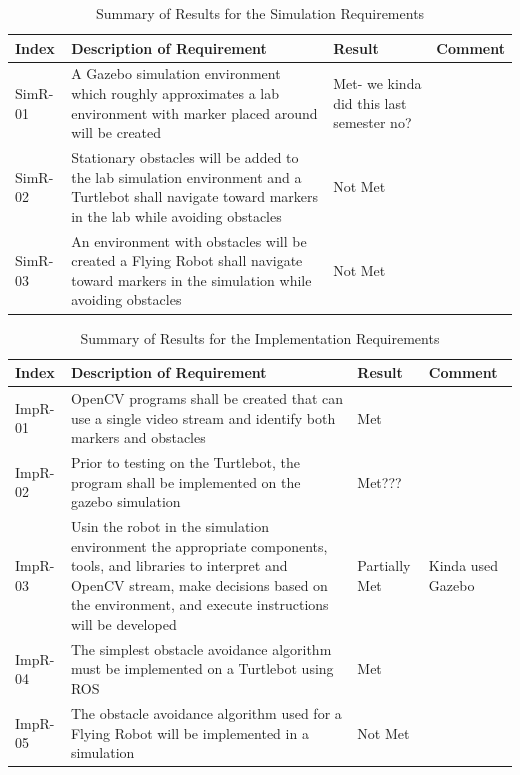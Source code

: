 \documentclass{article}
\begin{document}
	\begin{table}
	    \small
		\begin{tabular}{p{2cm} p{8cm} p{2cm} p{3cm}}
			\hline
			{\textbf{Index}} & {\textbf{Description of Requirement}} & {\textbf{Result}} & {\textbf{Comment}} \\ \hline
SimR-01 & A Gazebo simulation environment which roughly approximates a lab environment with marker placed around will be created & Met- we kinda did this last semester no? \\
SimR-02 & Stationary obstacles will be added to the lab simulation environment and a Turtlebot shall navigate toward markers in the lab while avoiding obstacles & Not Met \\
SimR-03 & An environment with obstacles will be created a Flying Robot shall navigate toward markers in the simulation while avoiding obstacles & Not Met\\ \hline
		\end{tabular}
		\caption{Summary of Results for the Simulation Requirements}
		\label{table:simresults}
    \end{table}

	\begin{table}
	    \small
		\begin{tabular}{p{2cm} p{8cm} p{2cm} p{3cm}}
			\hline
			{\textbf{Index}} & {\textbf{Description of Requirement}} & {\textbf{Result}} & {\textbf{Comment}} \\ \hline 
ImpR-01 & OpenCV programs shall be created that can use a single video stream and identify both markers and obstacles & Met \\ 
ImpR-02 & Prior to testing on the Turtlebot, the program shall be implemented on the gazebo simulation & Met??? \\
ImpR-03 & Usin the robot in the simulation environment the appropriate components, tools, and libraries to interpret and OpenCV stream, make decisions based on the environment, and execute instructions will be developed & Partially Met & Kinda used Gazebo \\
ImpR-04 & The simplest obstacle avoidance algorithm must be implemented on a Turtlebot using ROS & Met \\
ImpR-05 & The obstacle avoidance algorithm used for a Flying Robot will be implemented in a simulation & Not Met \\ \hline
		\end{tabular}
		\caption{Summary of Results for the Implementation Requirements}
		\label{table:impresults}
    \end{table}
\end{document}
